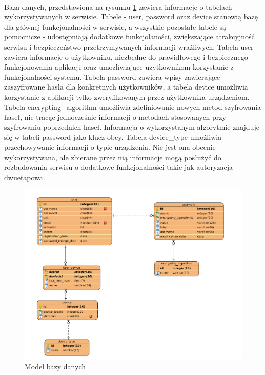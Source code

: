 \documentclass{article}
\begin{document}
    \paragraph{}Baza danych, przedstawiona na rysunku \ref{fig:db} zawiera informacje o tabelach wykorzystywanych w serwisie. Tabele - user, password oraz device stanowią bazę dla głównej funkcjonalności w serwisie, a wszystkie pozostałe tabele są pomocnicze - udostępniają dodatkowe funkcjolaności, zwiększające atrakcyjność serwisu i bezpieczeństwo przetrzymywanych informacji wrażliwych. Tabela user zawiera informacje o użytkowniku, niezbędne do prawidłowego i bezpiecznego funkcjonowania aplikacji oraz umożliwiające użytkownikom korzystanie z funkcjonalności systemu. Tabela password zawiera wpisy zawierające zaszyfrowane hasła dla konkretnych użytkowników, a tabela device umożliwia korzystanie z aplikacji tylko zweryfikowanym przez użytkownika urządzeniom. Tabela encrypting\_algorithm umożliwia zdefiniowanie nowych metod szyfrowania haseł, nie tracąc jednocześnie informacji o metodach stosowanych przy szyfrowaniu poprzednich haseł. Informacja o wykorzystanym algorytmie znajduje się w tabeli password jako klucz obcy. Tabela device\_type umożliwia przechowywanie informacji o typie urządzenia. Nie jest ona obecnie wykorzystywana, ale zbierane przez nią informacje mogą posłużyć do rozbudowania serwisu o dodatkowe funkcjonalności takie jak autoryzacja dwuetapowa.

    \begin{figure}[H]
		\centering
		\includegraphics[width=1\linewidth]{assets/db.png}
		\caption[]{Model bazy danych}
		\label{fig:db}
	\end{figure}
\end{document}
